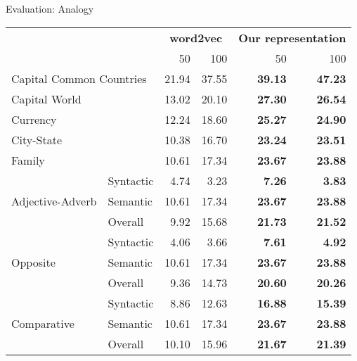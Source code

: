 \documentclass[8pt]{beamer}
\begin{document}
\begin{frame}{Evaluation: Analogy}
    \begin{tabular}{ll|rr|rr}
        \multicolumn{2}{l|}{\bf\multirow{2}{*}{Category}}& \multicolumn{2}{c|}{\bf word2vec} & \multicolumn{2}{c}{\bf Our representation}   \\ \cline{3-6}
        \multicolumn{2}{l|}{}                           & 50        & 100       & 50        & 100               \\\hline
        \multicolumn{2}{l|}{Capital Common Countries}   & 21.94     & 37.55     & \bf 39.13 & \bf 47.23         \\
        \multicolumn{2}{l|}{Capital World}              & 13.02     & 20.10     & \bf 27.30 & \bf 26.54         \\
        \multicolumn{2}{l|}{Currency}                   & 12.24     & 18.60     & \bf 25.27 & \bf 24.90         \\
        \multicolumn{2}{l|}{City-State}                 & 10.38     & 16.70     & \bf 23.24 & \bf 23.51         \\
        \multicolumn{2}{l|}{Family}                     & 10.61     & 17.34     & \bf 23.67 & \bf 23.88         \\ \hline
        \multirow{3}{*}{Adjective-Adverb}   & Syntactic & 4.74      & 3.23      & \bf 7.26  & \bf 3.83          \\
                                            & Semantic  & 10.61     & 17.34     & \bf 23.67 & \bf 23.88         \\
                                            & Overall   & 9.92      & 15.68     & \bf 21.73 & \bf 21.52         \\ \hline
        \multirow{3}{*}{Opposite}           & Syntactic & 4.06      & 3.66      & \bf 7.61  & \bf 4.92          \\
                                            & Semantic  & 10.61     & 17.34     & \bf 23.67 & \bf 23.88         \\
                                            & Overall   & 9.36      & 14.73     & \bf 20.60 & \bf 20.26         \\ \hline
        \multirow{3}{*}{Comparative}        & Syntactic & 8.86      & 12.63     & \bf 16.88 & \bf 15.39         \\
                                            & Semantic  & 10.61     & 17.34     & \bf 23.67 & \bf 23.88         \\
                                            & Overall   & 10.10     & 15.96     & \bf 21.67 & \bf 21.39         \\ \hline

\end{tabular}
\end{frame}
\end{document}
